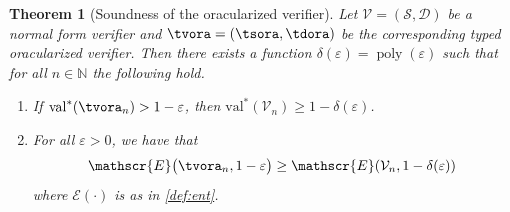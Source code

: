 \documentclass[11pt]{article}
\newtheorem{theorem}{Theorem}[section]
\theoremstyle{definition}
\newcommand{\N}{\ensuremath{\mathbb{N}}}
\DeclareMathOperator{\poly}{poly}
\newcommand{\val}{\ensuremath{\mathrm{val}}}
\newcommand{\eps}{\varepsilon}
\newcommand{\sampler}{\mathcal{S}}
\newcommand{\decider}{\mathcal{D}}
\newcommand{\verifier}{\mathcal{V}}
\newcommand{\Ent}{\mathscr{E}}
\begin{document}
\begin{theorem}[Soundness of the oracularized verifier]
  \label{thm:oracle-soundness}
  Let $\verifier = (\sampler, \decider)$ be a normal form verifier and
  $\tvora = (\tsora,\tdora)$ be the corresponding typed
  oracularized verifier.
  Then there exists a function $\delta(\eps) = \poly(\eps)$ such that for all $n
  \in \N$ the following hold.
  \begin{enumerate}
  \item If $\val^*(\tvora_n) > 1 - \eps$, then $\val^*(\verifier_n) \geq
    1 - \delta(\eps)$.
	\item For all $\eps > 0$, we have that
    \begin{equation*}
      \Ent \bigl( \tvora_n, 1 - \eps \bigr) \geq
      \Ent(\verifier_{n}, 1 - \delta(\eps))
    \end{equation*}
    where $\Ent(\cdot)$ is as in \cref{def:ent}.
  \end{enumerate}
\end{theorem}
\end{document}

